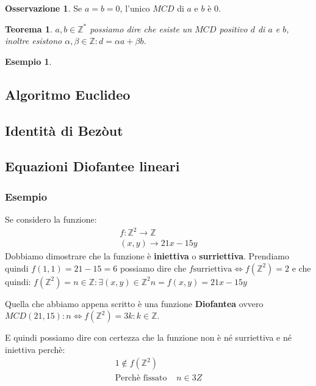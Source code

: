\documentclass{article}
\newtheorem{exmp}{Esempio}[section]
\newtheorem{theorem}{Teorema}[section]
\theoremstyle{definition}
\newtheorem{oss}{Osservazione}[section]
\begin{document}
\begin{oss}
        Se $ a = b = 0 $, l'unico $ MCD $ di $ a $ e $ b $ è $ 0 $.
\end{oss}

\begin{tcolorbox}
        \begin{theorem}
        $ a,b \in \mathbb{Z}^*$ possiamo dire che esiste un $ MCD $ positivo $ d $ di $ a $ e $ b $, inoltre esistono $ \alpha, \beta \in \mathbb{Z} : d = \alpha a + \beta b$.                
        \end{theorem}
\end{tcolorbox}
\begin{exmp}
        
\end{exmp}


\subsection{Algoritmo Euclideo}
\subsection{Identità di Bezòut}
\subsection{Equazioni Diofantee lineari}\label{sec:equazione_diofantea_lineare}

\subsubsection{Esempio}
Se considero la funzione:
\begin{align}
        f :  \mathbb{Z}^{2} \rightarrow \mathbb{Z} \\
        (x,y) \rightarrow 21x - 15y
\end{align}
Dobbiamo dimostrare che la funzione è \textbf{iniettiva} o \textbf{surriettiva}.
Prendiamo quindi $f(1,1) = 21 - 15 = 6$ possiamo dire che \newline
$f \textrm{surriettiva} \Leftrightarrow f(\mathbb{Z}^{2}) = 2$
e che quindi:
$f(\mathbb{Z}^{2}) = {n \in \mathbb{Z} : \exists(x,y) \in \mathbb{Z}^{2} n=f(x,y)=21x - 15y} $
     
Quella che abbiamo appena scritto è una funzione \textbf{Diofantea} ovvero $MCD(21,15) : n \Leftrightarrow f(\mathbb{Z}^{2})={3k : k \in \mathbb{Z}}$. \par

E quindi possiamo dire con certezza che la funzione non è né surriettiva e né iniettiva perchè:
\begin{align*}
        1 \notin f(\mathbb{Z}^{2}) \\
        \textrm{Perchè fissato } & n \in 3Z
\end{align*}
\end{document}
